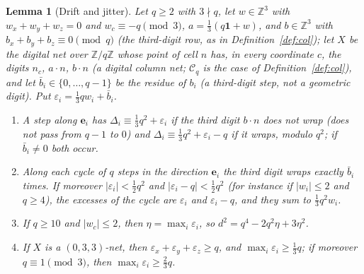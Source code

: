 \documentclass[11pt]{amsart}
\newtheorem{lemma}[theorem]{Lemma}
\theoremstyle{definition}
\theoremstyle{plain}
\newcommand{\Z}{\mathbb{Z}}
\newcommand{\e}{\mathbf{e}}
\begin{document}
\begin{lemma}[Drift and jitter]\label{lem:drift}
Let $q\ge2$ with $3\nmid q$, let $w\in\Z^3$ with $w_x+w_y+w_z=0$ and $w_c\equiv-q\pmod3$, $a=\frac13(q\mathbf 1+w)$, and $b\in\Z^3$ with $b_x+b_y+b_z\equiv0\pmod q$ (the third-digit row, as in Definition~\ref{def:col}); let $X$ be the digital net over $\Z/q\Z$ whose point of cell $n$ has, in every coordinate $c$, the digits $n_c$, $a\cdot n$, $b\cdot n$ (a \emph{digital column net}; $\mathcal C_q$ is the case of Definition~\ref{def:col}), and let $\bar b_i\in\{0,\dots,q-1\}$ be the residue of $b_i$ (a third-digit step, not a geometric digit). Put $\varepsilon_i=\frac13qw_i+\bar b_i$.
\begin{enumerate}
\item A step along $\e_i$ has $\Delta_i\equiv\frac13q^2+\varepsilon_i$ if the third digit $b\cdot n$ does not wrap (does not pass from $q-1$ to $0$) and $\Delta_i\equiv\frac13q^2+\varepsilon_i-q$ if it wraps, modulo $q^2$; if $\bar b_i\ne0$ both occur.
\item Along each cycle of $q$ steps in the direction $\e_i$ the third digit wraps exactly $\bar b_i$ times. If moreover $|\varepsilon_i|<\frac12q^2$ and $|\varepsilon_i-q|<\frac12q^2$ (for instance if $|w_i|\le2$ and $q\ge4$), the excesses of the cycle are $\varepsilon_i$ and $\varepsilon_i-q$, and they sum to $\frac13q^2w_i$.
\item If $q\ge10$ and $|w_c|\le2$, then $\eta=\max_i\varepsilon_i$, so $d^2=q^4-2q^2\eta+3\eta^2$.
\item If $X$ is a $(0,3,3)$-net, then $\varepsilon_x+\varepsilon_y+\varepsilon_z\ge q$, and $\max_i\varepsilon_i\ge\frac13q$; if moreover $q\equiv1\pmod3$, then $\max_i\varepsilon_i\ge\frac23q$.
\end{enumerate}
\end{lemma}
\end{document}
